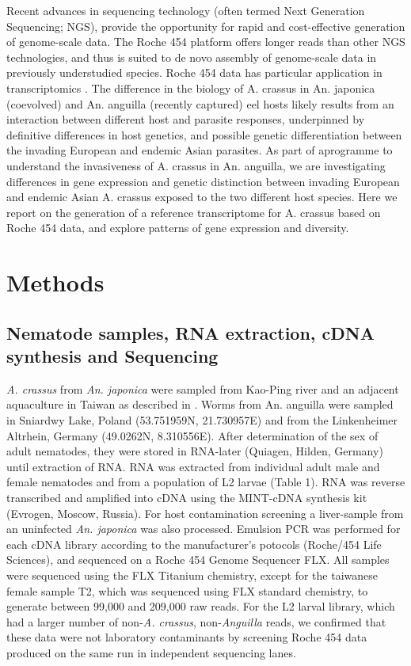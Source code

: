 \documentclass[10pt]{bmc_article}
\newenvironment{bmcformat}{\begin{raggedright}\baselineskip20pt\sloppy\setboolean{publ}{false}}{\end{raggedright}\baselineskip20pt\sloppy}
\begin{document}
\begin{bmcformat}
Recent advances in sequencing technology (often termed Next Generation
Sequencing; NGS), provide the opportunity for rapid and cost-effective
generation of genome-scale data. The Roche 454 platform
\cite{pmid16056220} offers longer reads than other NGS technologies,
and thus is suited to de novo assembly of genome-scale data in
previously understudied species. Roche 454 data has particular
application in transcriptomics \cite{pmid20950480}. The difference in
the biology of A. crassus in An. japonica (coevolved) and An. anguilla
(recently captured) eel hosts likely results from an interaction
between different host and parasite responses, underpinned by
definitive differences in host genetics, and possible genetic
differentiation between the invading European and endemic Asian
parasites. As part of aprogramme to understand the invasiveness of
A. crassus in An. anguilla, we are investigating differences in gene
expression and genetic distinction between invading European and
endemic Asian A. crassus exposed to the two different host
species. Here we report on the generation of a reference transcriptome
for A. crassus based on Roche 454 data, and explore patterns of gene
expression and diversity.


\section*{Methods}


\subsection*{Nematode samples, RNA extraction, cDNA synthesis and Sequencing}

\textit{A. crassus} from \textit{An. japonica} were sampled from
Kao-Ping river and an adjacent aquaculture in Taiwan as described in
\cite{heitlinger_massive_2009}. Worms from An. anguilla were sampled
in Sniardwy Lake, Poland (53.751959N, 21.730957E) and from the
Linkenheimer Altrhein, Germany (49.0262N, 8.310556E). After
determination of the sex of adult nematodes, they were stored in
RNA-later (Quiagen, Hilden, Germany) until extraction of RNA. RNA was
extracted from individual adult male and female nematodes and from a
population of L2 larvae (Table 1). RNA was reverse transcribed and
amplified into cDNA using the MINT-cDNA synthesis kit (Evrogen,
Moscow, Russia).  For host contamination screening a liver-sample from
an uninfected \textit{An. japonica} was also processed.  Emulsion PCR
was performed for each cDNA library according to the manufacturer’s
potocols (Roche/454 Life Sciences), and sequenced on a Roche 454
Genome Sequencer FLX. All samples were sequenced using the FLX
Titanium chemistry, except for the taiwanese female sample T2, which
was sequenced using FLX standard chemistry, to generate between 99,000
and 209,000 raw reads. For the L2 larval library, which had a larger
number of non-\textit{A. crassus}, non-\textit{Anguilla} reads, we
confirmed that these data were not laboratory contaminants by
screening Roche 454 data produced on the same run in independent
sequencing lanes.



\end{bmcformat}
\end{document}
